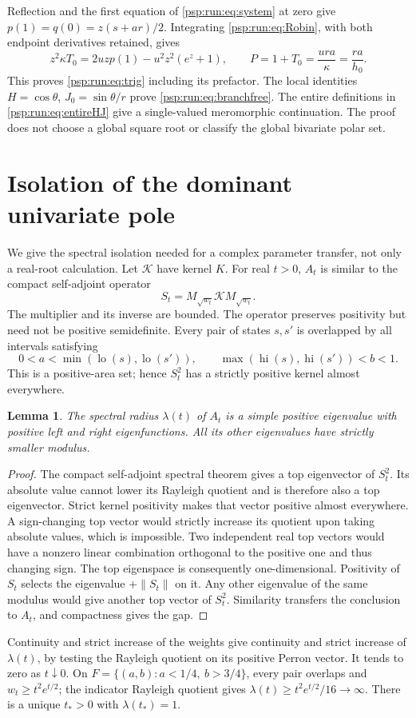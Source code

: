 \documentclass[11pt,letterpaper]{article}
\numberwithin{equation}{section}
\newtheorem{lemma}[theorem]{Lemma}
\theoremstyle{remark}\newtheorem{remark}[theorem]{Remark}
\newcommand{\lo}{\operatorname{lo}}
\newcommand{\hi}{\operatorname{hi}}
\begin{document}
Reflection and the first equation of \eqref{psp:run:eq:system} at zero give
$p(1)=q(0)=z(s+ar)/2$. Integrating \eqref{psp:run:eq:Robin}, with both endpoint
derivatives retained, gives
\[
 z^2\kappa T_0=2uzp(1)-u^2z^2(e^z+1),\qquad
 P=1+T_0=\frac{ura}{\kappa}=\frac{ra}{h_0}.
\]
This proves \eqref{psp:run:eq:trig} including its prefactor. The local identities
$H=\cos\theta$, $J_0=\sin\theta/r$ prove \eqref{psp:run:eq:branchfree}.
The entire definitions in \eqref{psp:run:eq:entireHJ} give a single-valued
meromorphic continuation. The proof does not choose a global square
root or classify the global bivariate polar set.

\section{Isolation of the dominant univariate pole}\label{psp:run:sec:dominance}
We give the spectral isolation needed for a complex parameter transfer,
not only a real-root calculation. Let $\mathcal K$ have kernel $K$.
For real $t>0$, $A_t$ is similar to the compact self-adjoint operator
\[
 S_t=M_{\sqrt{w_t}}\mathcal K M_{\sqrt{w_t}}.
\]
The multiplier and its inverse are bounded. The operator preserves
positivity but need not be positive semidefinite. Every pair of states
$s,s'$ is overlapped by all intervals satisfying
\[
 0<a<\min(\lo(s),\lo(s')),
 \qquad \max(\hi(s),\hi(s'))<b<1.
\]
This is a positive-area set; hence $S_t^2$ has a strictly positive kernel
almost everywhere.

\begin{lemma}\label{psp:run:lem:perron}
The spectral radius $\lambda(t)$ of $A_t$ is a simple positive eigenvalue
with positive left and right eigenfunctions. All its other eigenvalues
have strictly smaller modulus.
\end{lemma}
\begin{proof}
The compact self-adjoint spectral theorem gives a top eigenvector of
$S_t^2$. Its absolute value cannot lower its Rayleigh quotient and is
therefore also a top eigenvector. Strict kernel positivity makes that
vector positive almost everywhere. A sign-changing top vector would
strictly increase its quotient upon taking absolute values, which is
impossible. Two independent real top vectors would have a nonzero linear
combination orthogonal to the positive one and thus changing sign.
The top eigenspace is consequently one-dimensional. Positivity of $S_t$
selects the eigenvalue $+\|S_t\|$ on it. Any other eigenvalue of the same
modulus would give another top vector of $S_t^2$. Similarity transfers
the conclusion to $A_t$, and compactness gives the gap.
\end{proof}
Continuity and strict increase of the weights give continuity and strict
increase of $\lambda(t)$, by testing the Rayleigh quotient on its positive
Perron vector. It tends to zero as $t\downarrow0$. On
$F=\{(a,b):a<1/4,\ b>3/4\}$, every pair overlaps and
$w_t\geq t^2e^{t/2}$; the indicator Rayleigh quotient gives
$\lambda(t)\geq t^2e^{t/2}/16\to\infty$.
There is a unique $t_*>0$ with $\lambda(t_*)=1$.
\end{document}
